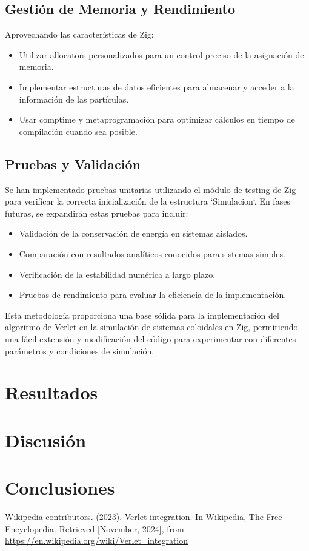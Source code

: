 \documentclass[twocolumn]{article}
\begin{document}
\subsection*{Gestión de Memoria y Rendimiento}
Aprovechando las características de Zig:

\begin{itemize}
    \item Utilizar allocators personalizados para un control preciso de la asignación de memoria.
    \item Implementar estructuras de datos eficientes para almacenar y acceder a la información de las partículas.
    \item Usar comptime y metaprogramación para optimizar cálculos en tiempo de compilación cuando sea posible.
\end{itemize}

\subsection*{Pruebas y Validación}
Se han implementado pruebas unitarias utilizando el módulo de testing de Zig para verificar la correcta inicialización de la estructura `Simulacion`. En fases futuras, se expandirán estas pruebas para incluir:

\begin{itemize}
    \item Validación de la conservación de energía en sistemas aislados.
    \item Comparación con resultados analíticos conocidos para sistemas simples.
    \item Verificación de la estabilidad numérica a largo plazo.
    \item Pruebas de rendimiento para evaluar la eficiencia de la implementación.
\end{itemize}

Esta metodología proporciona una base sólida para la implementación del algoritmo de Verlet en la simulación de sistemas coloidales en Zig, permitiendo una fácil extensión y modificación del código para experimentar con diferentes parámetros y condiciones de simulación.

\section{Resultados}

\section{Discusión}

\section{Conclusiones}

\begin{thebibliography}{9}
 Wikipedia contributors. (2023). Verlet integration. In Wikipedia, The Free Encyclopedia. Retrieved [November, 2024], from \url{https://en.wikipedia.org/wiki/Verlet_integration}
\end{thebibliography}
\end{document}
